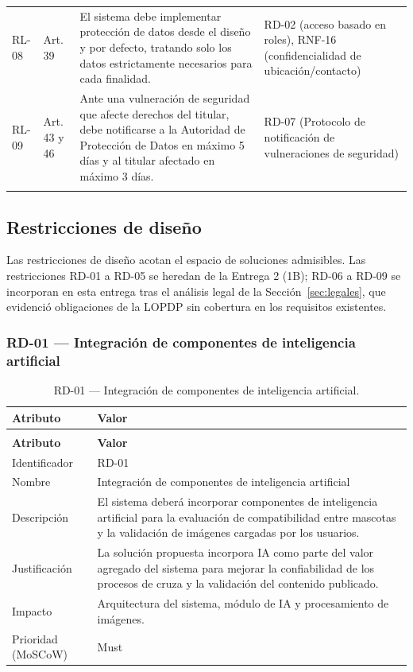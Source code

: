\documentclass[journal,onecolumn]{IEEEtran}
\makeatletter
\newenvironment{atributos}[2]{%
	\small
	\begin{longtable}{@{}>{\raggedright\arraybackslash}p{4.2cm} >{\raggedright\arraybackslash}p{11.2cm}@{}}
		\caption{#2}\label{tab:#1}\\
		\toprule
		\textbf{Atributo} & \textbf{Valor} \\
		\midrule
		\endfirsthead
		\multicolumn{2}{@{}l}{\small\itshape (continuación)}\\
		\toprule
		\textbf{Atributo} & \textbf{Valor} \\
		\midrule
		\endhead
		\bottomrule
		\endlastfoot
	}{%
	\end{longtable}
	\normalsize
}
\makeatother
\begin{document}
\begin{table}[H]
\begin{tabularx}{\textwidth}{@{}p{1.1cm} p{1.9cm} p{5.4cm} X@{}}
			\addlinespace
			RL-08 & Art. 39 & El sistema debe implementar protección de datos desde el diseño y por defecto, tratando solo los datos estrictamente necesarios para cada finalidad. & RD-02 (acceso basado en roles), RNF-16 (confidencialidad de ubicación/contacto) \\
			\addlinespace
			RL-09 & Art. 43 y 46 & Ante una vulneración de seguridad que afecte derechos del titular, debe notificarse a la Autoridad de Protección de Datos en máximo 5 días y al titular afectado en máximo 3 días. & RD-07 (Protocolo de notificación de vulneraciones de seguridad) \\
			\addlinespace
			\bottomrule
		\end{tabularx}
	\end{table}
	
	\subsection{Restricciones de diseño}
	\label{sec:restricciones}
	
	Las restricciones de diseño acotan el espacio de soluciones admisibles. Las
	restricciones RD-01 a RD-05 se heredan de la Entrega 2 (1B); RD-06 a RD-09 se
	incorporan en esta entrega tras el análisis legal de la Sección~\ref{sec:legales},
	que evidenció obligaciones de la LOPDP sin cobertura en los requisitos existentes.
	
	\subsubsection{RD-01 --- Integración de componentes de inteligencia artificial}
	
	\begin{atributos}{RD-01}{RD-01 --- Integración de componentes de inteligencia artificial.}
		Identificador & RD-01 \\
		Nombre & Integración de componentes de inteligencia artificial \\
		Descripción & El sistema deberá incorporar componentes de inteligencia artificial para la evaluación de compatibilidad entre mascotas y la validación de imágenes cargadas por los usuarios. \\
		Justificación & La solución propuesta incorpora IA como parte del valor agregado del sistema para mejorar la confiabilidad de los procesos de cruza y la validación del contenido publicado. \\
		Impacto & Arquitectura del sistema, módulo de IA y procesamiento de imágenes. \\
		Prioridad (MoSCoW) & Must \\
	\end{atributos}
	
\end{document}
